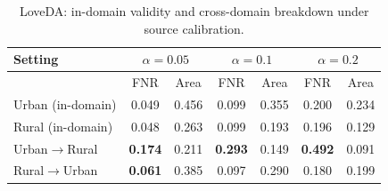 \begin{table}[t]
\centering
\footnotesize
\setlength{\tabcolsep}{3pt}
\begin{tabular}{lcccccc}
\toprule
Setting & \multicolumn{2}{c}{$\alpha=0.05$} & \multicolumn{2}{c}{$\alpha=0.1$} & \multicolumn{2}{c}{$\alpha=0.2$} \\
\midrule
 & FNR & Area & FNR & Area & FNR & Area \\
\midrule
Urban (in-domain) & 0.049 & 0.456 & 0.099 & 0.355 & 0.200 & 0.234 \\
Rural (in-domain) & 0.048 & 0.263 & 0.099 & 0.193 & 0.196 & 0.129 \\
\addlinespace
Urban$\to$Rural & \textbf{0.174} & 0.211 & \textbf{0.293} & 0.149 & \textbf{0.492} & 0.091 \\
Rural$\to$Urban & \textbf{0.061} & 0.385 & 0.097 & 0.290 & 0.180 & 0.199 \\
\bottomrule
\end{tabular}
\caption{LoveDA: in-domain validity and cross-domain breakdown under source calibration.}
\label{tab:loveda}
\end{table}
